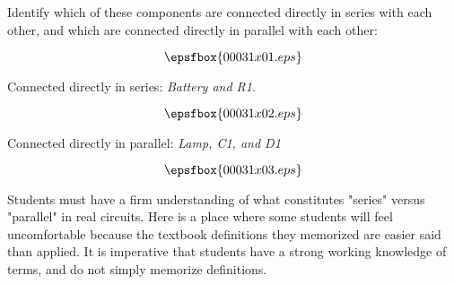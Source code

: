 

Identify which of these components are connected directly in series with each other, and which are connected directly in parallel with each other:

$$\epsfbox{00031x01.eps}$$







Connected directly in series: {\it Battery and R1}.  

$$\epsfbox{00031x02.eps}$$

\vskip 10pt

Connected directly in parallel: {\it Lamp, C1, and D1}

$$\epsfbox{00031x03.eps}$$







Students must have a firm understanding of what constitutes "series" versus "parallel" in real circuits.  Here is a place where some students will feel uncomfortable because the textbook definitions they memorized are easier said than applied.  It is imperative that students have a strong working knowledge of terms, and do not simply memorize definitions.




